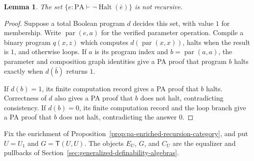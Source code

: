 \documentclass[11pt]{article}
\newtheorem{lemma}[theorem]{Lemma}
\theoremstyle{definition}
\theoremstyle{remark}
\begin{document}
\begin{lemma}\label{lem:pa-nonhalting-undecidable}
The set $\{e:\mathrm{PA}\vdash\neg\operatorname{Halt}(\bar e)\}$
is not recursive.
\end{lemma}
\begin{proof}
Suppose a total Boolean program $d$ decides this set, with value
$1$ for membership. Write $\operatorname{par}(e,a)$ for the
verified parameter operation. Compile a binary program $q(x,z)$
which computes $d(\operatorname{par}(x,x))$, halts when the
result is $1$, and otherwise loops. If $a$ is its program index
and $b=\operatorname{par}(a,a)$, the parameter and composition
graph identities give a PA proof that program $b$ halts exactly
when $d(\bar b)$ returns $1$.

If $d(b)=1$, its finite computation record gives a PA proof
that $b$ halts. Correctness of $d$ also gives a PA proof that
$b$ does not halt, contradicting consistency.
If $d(b)=0$, its finite computation record and the loop branch
give a PA proof that $b$ does not halt, contradicting the
answer $0$.
\end{proof}

Fix the enrichment of
Proposition~\ref{prop:pa-enriched-recursion-category}, and put
$U=U_1$ and $G=\mathsf T(U,U)$.
The objects $E_U$, $G$, and $C_U$ are the equalizer and pullbacks
of Section~\ref{sec:generalized-definability-algebras}.
\end{document}
